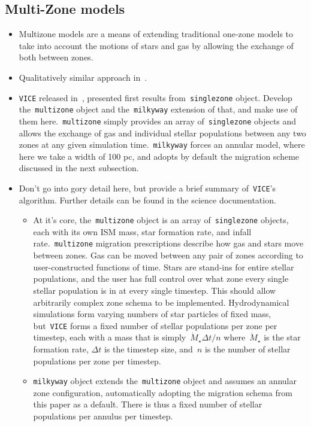 \documentclass[a4paper, fleqn, usenatbib, useAMS]{mnras}
\begin{document}
\subsection{Multi-Zone models} 
\label{sec:methods:multizone} 
\begin{itemize} 
	\item Multizone models are a means of extending traditional one-zone 
	models to take into account the motions of stars and gas by allowing the 
	exchange of both between zones. 

	\item Qualitatively similar approach in~\citet{Matteucci1989, 
	Schoenrich2009, Minchev2013}. 

	\item \texttt{VICE} released in~\citet{Johnson2020}, presented first 
	results from~\texttt{singlezone} object. Develop the~\texttt{multizone} 
	object and the~\texttt{milkyway} extension of that, and make use of them 
	here.~\texttt{multizone} simply provides an array of~\texttt{singlezone} 
	objects and allows the exchange of gas and individual stellar populations 
	between any two zones at any given simulation time.~\texttt{milkyway} 
	forces an annular model, where here we take a width of 100 pc, and 
	adopts by default the migration scheme discussed in the next subsection. 

	\item Don't go into gory detail here, but provide a brief summary 
	of~\texttt{VICE}'s algorithm. Further details can be found in the 
	science documentation. 
	\begin{itemize} 
		\item At it's core, the~\texttt{multizone} object is an array 
		of~\texttt{singlezone} objects, each with its own ISM mass, star 
		formation rate, and infall rate.~\texttt{multizone} migration 
		prescriptions describe how gas and stars move between zones. Gas can be 
		moved between any pair of zones according to user-constructed functions 
		of time. Stars are stand-ins for entire stellar populations, and the 
		user has full control over what zone every single stellar population 
		is in at every single timestep. This should allow arbitrarily complex 
		zone schema to be implemented. Hydrodynamical simulations form varying 
		numbers of star particles of fixed mass, but~\texttt{VICE} forms a 
		fixed number of stellar populations per zone per timestep, each with a 
		mass that is simply~$\dot{M}_\star\Delta t / n$ where~$\dot{M}_\star$ 
		is the star formation rate, $\Delta t$ is the timestep size, 
		and~$n$ is the number of stellar populations per zone per timestep. 

		\item \texttt{milkyway} object extends the~\texttt{multizone} object 
		and assumes an annular zone configuration, automatically adopting the 
		migration schema from this paper as a default. There is thus a fixed 
		number of stellar populations per annulus per timestep. 
	\end{itemize} 
\end{itemize} 
\end{document}
